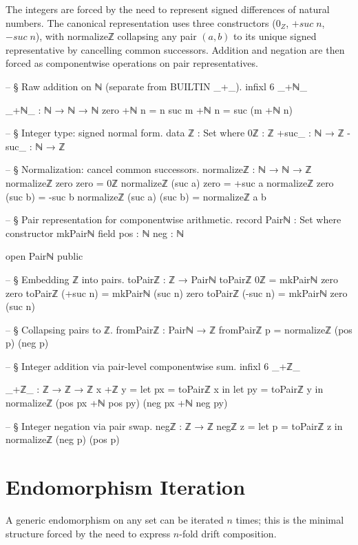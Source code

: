 \documentclass[11pt,a4paper]{book}
\def\mathrm#1{#1}%
\def\mathbb#1{#1}%
\def\texttt#1{#1}%
\begin{document}
The integers are forced by the need to represent signed differences of natural numbers.
The canonical representation uses three constructors ($0_{\mathbb{Z}}$, $+\mathrm{suc}\;n$,
$-\mathrm{suc}\;n$), with \texttt{normalizeℤ} collapsing any pair $(a,b)$ to its unique
signed representative by cancelling common successors. Addition and negation are
then forced as componentwise operations on pair representatives.

\begin{code}
-- § Raw addition on ℕ (separate from BUILTIN _+_).
infixl 6 _+ℕ_

_+ℕ_ : ℕ → ℕ → ℕ
zero +ℕ n = n
suc m +ℕ n = suc (m +ℕ n)

-- § Integer type: signed normal form.
data ℤ : Set where
  0ℤ    : ℤ
  +suc_ : ℕ → ℤ
  -suc_ : ℕ → ℤ

-- § Normalization: cancel common successors.
normalizeℤ : ℕ → ℕ → ℤ
normalizeℤ zero zero = 0ℤ
normalizeℤ (suc a) zero = +suc a
normalizeℤ zero (suc b) = -suc b
normalizeℤ (suc a) (suc b) = normalizeℤ a b

-- § Pair representation for componentwise arithmetic.
record Pairℕ : Set where
  constructor mkPairℕ
  field
    pos : ℕ
    neg : ℕ

open Pairℕ public

-- § Embedding ℤ into pairs.
toPairℤ : ℤ → Pairℕ
toPairℤ 0ℤ = mkPairℕ zero zero
toPairℤ (+suc n) = mkPairℕ (suc n) zero
toPairℤ (-suc n) = mkPairℕ zero (suc n)

-- § Collapsing pairs to ℤ.
fromPairℤ : Pairℕ → ℤ
fromPairℤ p = normalizeℤ (pos p) (neg p)

-- § Integer addition via pair-level componentwise sum.
infixl 6 _+ℤ_

_+ℤ_ : ℤ → ℤ → ℤ
x +ℤ y =
  let px = toPairℤ x in
  let py = toPairℤ y in
  normalizeℤ (pos px +ℕ pos py) (neg px +ℕ neg py)

-- § Integer negation via pair swap.
negℤ : ℤ → ℤ
negℤ z =
  let p = toPairℤ z in
  normalizeℤ (neg p) (pos p)
\end{code}

\section{Endomorphism Iteration}

A generic endomorphism on any set can be iterated $n$ times; this is the minimal
structure forced by the need to express $n$-fold drift composition.
\end{document}

